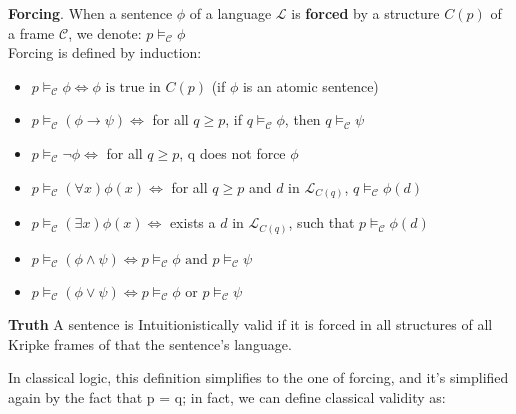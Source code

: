 \documentclass[runningheads]{llncs}
\begin{document}
\begin{definition}\textbf{Forcing}.
          When a sentence $\phi$ of a language $\mathcal{L}$ is \textbf{forced} by a structure $C(p)$ of a frame $\mathcal{C}$, we denote:
        $ p \vDash_{\mathcal{C}} \phi$ \\
         Forcing is defined by induction: \cite{book1}



        \begin{itemize}
            \item    $ p \vDash_{\mathcal{C}} \phi                 \Leftrightarrow \phi \text{ is true in } C(p)$ (if $\phi$ is an atomic sentence)\\
            \item    $ p \vDash_{\mathcal{C}} (\phi \to \psi)      \Leftrightarrow$   for all $q \geq p$, if $q \vDash_{\mathcal{C}} \phi$, then $q \vDash_{\mathcal{C}} \psi$
            \item    $ p \vDash_{\mathcal{C}} \neg \phi            \Leftrightarrow $  for all $q \geq p$, q does not force $\phi$\\
            \item    $ p \vDash_{\mathcal{C}} (\forall x) \phi(x)  \Leftrightarrow $  for all $q \geq p$ and $d$ in $\mathcal{L}_{C(q)}$, $q \vDash_{\mathcal{C}} \phi(d)$ \\
            \item    $ p \vDash_{\mathcal{C}} (\exists x) \phi(x)  \Leftrightarrow $  exists a $d$ in  $\mathcal{L}_{C(q)}$, such that $p \vDash_{\mathcal{C}} \phi(d)$\\
            \item    $ p \vDash_{\mathcal{C}} (\phi \land \psi)    \Leftrightarrow p \vDash_{\mathcal{C}} \phi \text{ and } p \vDash_{\mathcal{C}} \psi$ \\
            \item    $ p \vDash_{\mathcal{C}} (\phi \lor \psi)     \Leftrightarrow p \vDash_{\mathcal{C}} \phi$ or $p \vDash_{\mathcal{C}} \psi$ \\
        \end{itemize}
\end{definition}
\begin{definition}
    \textbf{Truth}
    A sentence is Intuitionistically valid if it is forced in all structures of all Kripke
        frames of that the sentence's language.
\end{definition}

In classical logic, this definition simplifies to the one of forcing, and it's simplified again by the fact that p = q; in fact, we can define classical validity as: \cite{book1}
\end{document}
